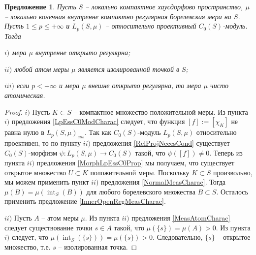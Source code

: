 \documentclass[12pt]{article}
\newtheorem{proposition}[theorem]{Предложение}
\begin{document}
\begin{proposition}\label{LpC0ModNecessCond}  Пусть $S$ -- локально компактное хаусдорфово пространство, $\mu$ -- локально конечная внутренне компактно регулярная борелевская мера на $S$. Пусть $1\leq p\leq +\infty$ и $L_p(S,\mu)$ -- относительно проективный $C_0(S)$-модуль. Тогда

    $i)$ мера $\mu$ внутренне открыто регулярна;

    $ii)$ любой атом меры $\mu$ является изолированной точкой в $S$;

    $iii)$ если $p<+\infty$ и мера $\mu$ внешне открыто регулярна, то мера $\mu$ чисто атомическая.
\end{proposition}
\begin{proof} $i)$ Пусть $K\subset S$ -- компактное множество положительной меры. Из пункта $i)$ предложения \ref{LpEssC0ModCharac} следует, что функция $[f]:=[\chi_K]$ не равна нулю в $L_p(S,\mu)_{ess}$. Так как $C_0(S)$-модуль $L_p(S,\mu)$ относительно проективен, то по пункту $ii)$ предложения \ref{RelProjNecesCond} существует $C_0(S)$-морфизм $\psi:L_p(S,\mu)\to C_0(S)$ такой, что $\psi([f])\neq 0$. Теперь из пункта $ii)$ предложения \ref{MorphLpEssC0Prop} мы получаем, что существует открытое множество $U\subset K$ положительной меры. Поскольку $K\subset S$ произвольно, мы можем применить пункт $ii)$ предложения \ref{NormalMeasCharac}. Тогда $\mu(B)=\mu(\operatorname{int}_S(B))$ для любого борелевского множества $B\subset S$. Осталось применить предложение \ref{InnerOpenRegMeasCharac}.

    $ii)$ Пусть $A$ -- атом меры $\mu$. Из пункта $ii)$ предложения \ref{MeasAtomCharac} следует существование точки $s\in A$ такой, что $\mu(\{s\})=\mu(A)>0$. Из пункта $i)$ следует, что $\mu(\operatorname{int}_S(\{s\}))=\mu(\{s\})>0$. Следовательно, $\{s\}$ -- открытое множество, т.е. $s$ -- изолированная точка.


\end{proof}
\end{document}
